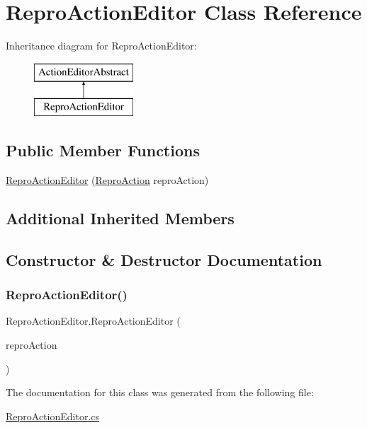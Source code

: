 \hypertarget{class_repro_action_editor}{}\section{Repro\+Action\+Editor Class Reference}
\label{class_repro_action_editor}
Inheritance diagram for Repro\+Action\+Editor\+:\begin{figure}[H]
\begin{center}
\leavevmode
\includegraphics[height=2.000000cm]{class_repro_action_editor}
\end{center}
\end{figure}
\subsection*{Public Member Functions}
\begin{DoxyCompactItemize}
\item 
\mbox{\hyperlink{class_repro_action_editor_a8b70d2f53e4eb6224411021fc5ea3f33}{Repro\+Action\+Editor}} (\mbox{\hyperlink{class_repro_action}{Repro\+Action}} repro\+Action)
\end{DoxyCompactItemize}
\subsection*{Additional Inherited Members}


\subsection{Constructor \& Destructor Documentation}
\mbox{\label{class_repro_action_editor_a8b70d2f53e4eb6224411021fc5ea3f33}} 
\subsubsection{\texorpdfstring{Repro\+Action\+Editor()}{ReproActionEditor()}}
{\footnotesize\ttfamily Repro\+Action\+Editor.\+Repro\+Action\+Editor (\begin{DoxyParamCaption}\item[{\mbox{\hyperlink{class_repro_action}{Repro\+Action}}}]{repro\+Action }\end{DoxyParamCaption})}



The documentation for this class was generated from the following file\+:\begin{DoxyCompactItemize}
\item 
\mbox{\hyperlink{_repro_action_editor_8cs}{Repro\+Action\+Editor.\+cs}}\end{DoxyCompactItemize}
